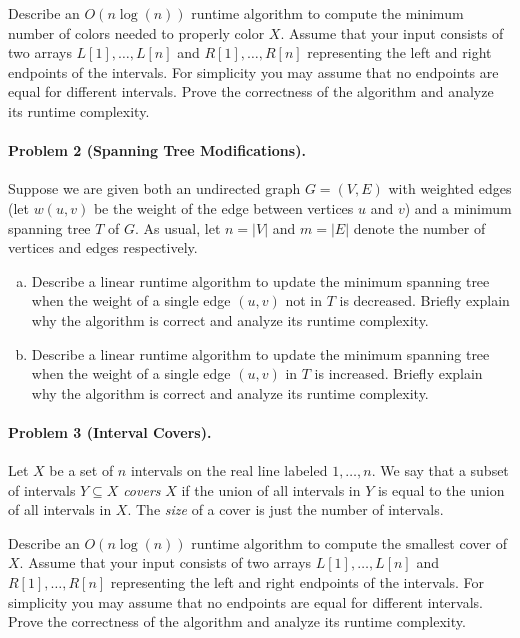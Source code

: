 \documentclass[11pt]{article}
\begin{document}
Describe an $O(n \log(n))$ runtime algorithm to compute the minimum number of colors needed to properly color \(X\). Assume that your input consists of two arrays \(L[1], \dots, L[n]\) and \(R[1],\dots, R[n]\) representing the left and right endpoints of the intervals. For simplicity you may assume that no endpoints are equal for different intervals. Prove the correctness of the algorithm and analyze its runtime complexity.

\newpage
\paragraph{Problem 2 (Spanning Tree Modifications).} Suppose we are given both an undirected graph $G = (V,E)$ with weighted edges (let $w(u,v)$ be the weight of the edge between vertices $u$ and $v$) and a minimum spanning tree $T$ of $G$. As usual, let $n = |V|$ and $m = |E|$ denote the number of vertices and edges respectively.

\begin{enumerate}[(a)]
    \item Describe a linear runtime algorithm to update the minimum spanning tree when the weight of a single edge $(u,v)$ not in $T$ is decreased. Briefly explain why the algorithm is correct and analyze its runtime complexity.
    \item Describe a linear runtime algorithm to update the minimum spanning tree when the weight of a single edge $(u,v)$ in $T$ is increased. Briefly explain why the algorithm is correct and analyze its runtime complexity.
\end{enumerate}


\newpage
\paragraph{Problem 3 (Interval Covers).} Let \(X\) be a set of \(n\) intervals on the real line labeled $1, \dots, n$. We say that a subset of intervals \(Y \subseteq X\) \textit{covers} \(X\) if the union of all intervals in \(Y\) is equal to the union of all intervals in \(X\). The \textit{size} of a cover is just the number of intervals.

Describe an $O(n \log(n))$ runtime algorithm to compute the smallest cover of \(X\). Assume that your input consists of two arrays \(L[1], \dots, L[n]\) and \(R[1],\dots, R[n]\) representing the left and right endpoints of the intervals. For simplicity you may assume that no endpoints are equal for different intervals. Prove the correctness of the algorithm and analyze its runtime complexity.
\end{document}
